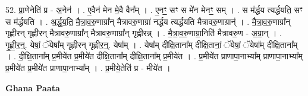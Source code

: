 \documentclass[17pt]{extarticle}
\begin{document}
52. प्रा॒णेनेति॑ प्र - अ॒नेन॑ । . ए॒वैन॑ मेन मे॒वै वैन᳚म् । . ए॒नꣳ॒॒ सꣳ स मे॑न मेनꣳ॒॒ सम् । . स म॑र्द्धय त्यर्द्धयति॒ सꣳ स म॑र्द्धयति । . अ॒र्द्ध॒य॒ति॒ मै॒त्रा॒व॒रु॒णाग्रा᳚न् मैत्रावरु॒णाग्रा॑ नर्द्धय त्यर्द्धयति मैत्रावरु॒णाग्रान्॑ । . मै॒त्रा॒व॒रु॒णाग्रा᳚न् गृह्णीरन् गृह्णीरन् मैत्रावरु॒णाग्रा᳚न् मैत्रावरु॒णाग्रा᳚न् गृह्णीरन्न् । . मै॒त्रा॒व॒रु॒णाग्रा॒निति॑ मैत्रावरु॒ण - अ॒ग्रा॒न् । . गृ॒ह्णी॒र॒न्॒. येषां॒ ॅयेषा᳚म् गृह्णीरन् गृह्णीर॒न्॒. येषा᳚म् । . येषा᳚म् दीक्षि॒ताना᳚म् दीक्षि॒तानां॒ ॅयेषां॒ ॅयेषा᳚म् दीक्षि॒ताना᳚म् । . दी॒क्षि॒ताना᳚म् प्र॒मीये॑त प्र॒मीये॑त दीक्षि॒ताना᳚म् दीक्षि॒ताना᳚म् प्र॒मीये॑त । . प्र॒मीये॑त प्राणापा॒नाभ्या᳚म् प्राणापा॒नाभ्या᳚म् प्र॒मीये॑त प्र॒मीये॑त प्राणापा॒नाभ्या᳚म् । . प्र॒मीये॒तेति॑ प्र - मीये॑त । \newline

\textbf{Ghana Paata } \newline
\end{document}

